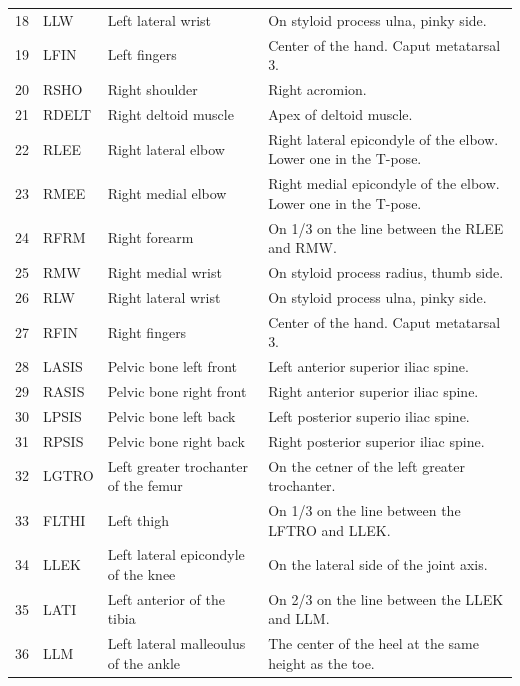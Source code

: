 \documentclass[10pt,a4paper,twocolumn]{article}
\begin{document}
\begin{table}
\begin{tabular}{rlll}
    18 & LLW   & Left lateral wrist                    & On styloid process ulna, pinky side. \\
    19 & LFIN  & Left fingers                          & Center of the hand. Caput metatarsal 3. \\
    20 & RSHO  & Right shoulder                        & Right acromion. \\
    21 & RDELT & Right deltoid muscle                  & Apex of deltoid muscle. \\
    22 & RLEE  & Right lateral elbow                   & Right lateral epicondyle of the elbow. Lower one in the T-pose. \\
    23 & RMEE  & Right medial elbow                    & Right medial epicondyle of the elbow. Lower one in the T-pose. \\
    24 & RFRM  & Right forearm                         & On 1/3 on the line between the RLEE and RMW. \\
    25 & RMW   & Right medial wrist                    & On styloid process radius, thumb side. \\
    26 & RLW   & Right lateral wrist                   & On styloid process ulna, pinky side. \\
    27 & RFIN  & Right fingers                         & Center of the hand. Caput metatarsal 3. \\
    28 & LASIS & Pelvic bone left front                & Left anterior superior iliac spine. \\
    29 & RASIS & Pelvic bone right front               & Right anterior superior iliac spine. \\
    30 & LPSIS & Pelvic bone left back                 & Left posterior superio iliac spine. \\
    31 & RPSIS & Pelvic bone right back                & Right posterior superior iliac spine. \\
    32 & LGTRO & Left greater trochanter of the femur  & On the cetner of the left greater trochanter. \\
    33 & FLTHI & Left thigh                            & On 1/3 on the line between the LFTRO and LLEK. \\
    34 & LLEK  & Left lateral epicondyle of the knee   & On the lateral side of the joint axis. \\
    35 & LATI  & Left anterior of the tibia            & On 2/3 on the line between the LLEK and LLM. \\
    36 & LLM   & Left lateral malleoulus of the ankle  & The center of the heel at the same height as the toe. \\

\end{tabular}
\end{table}
\end{document}
